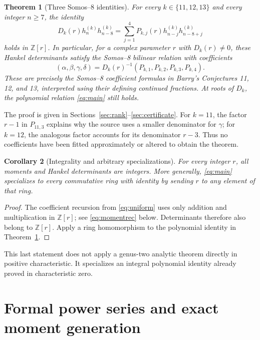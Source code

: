 \documentclass[11pt,letterpaper]{article}
\numberwithin{equation}{section}
\newtheorem{theorem}{Theorem}[section]
\newtheorem{corollary}[theorem]{Corollary}
\theoremstyle{definition}
\newcommand{\Z}{\mathbb Z}
\begin{document}
\begin{theorem}[Three Somos--8 identities]
\label{thm:main}
For every \(k\in\{11,12,13\}\) and every integer \(n\geq7\), the identity
\begin{equation}
 \boxed{\quad
 D_k(r)h_n^{(k)}h_{n-8}^{(k)}
 =\sum_{j=1}^4P_{k,j}(r)h_{n-j}^{(k)}h_{n-8+j}^{(k)}
 \quad}
 \label{eq:main}
\end{equation}
holds in \(\Z[r]\). In particular, for a complex parameter \(r\) with
\(D_k(r)\ne0\), these Hankel determinants satisfy the Somos--8 bilinear
relation with coefficients
\begin{equation}
 (\alpha,\beta,\gamma,\delta)
 =D_k(r)^{-1}(P_{k,1},P_{k,2},P_{k,3},P_{k,4}).
 \label{eq:normalized}
\end{equation}
These are precisely the Somos--8 coefficient formulas in Barry's
Conjectures 11, 12, and 13, interpreted using their defining continued
fractions. At roots of \(D_k\), the polynomial relation \eqref{eq:main}
still holds.
\end{theorem}

The proof is given in Sections~\ref{sec:rank}--\ref{sec:certificate}.
For \(k=11\), the factor \(r-1\) in \(P_{11,3}\) explains why the source
uses a smaller denominator for \(\gamma\); for \(k=12\), the analogous
factor accounts for its denominator \(r-3\). Thus no coefficients have
been fitted approximately or altered to obtain the theorem.

\begin{corollary}[Integrality and arbitrary specializations]
\label{cor:integral}
For every integer \(r\), all moments and Hankel determinants are integers.
More generally, \eqref{eq:main} specializes to every commutative ring with
identity by sending \(r\) to any element of that ring.
\end{corollary}
\begin{proof}
The coefficient recursion from \eqref{eq:uniform} uses only addition and
multiplication in \(\Z[r]\); see \eqref{eq:momentrec} below. Determinants
therefore also belong to \(\Z[r]\). Apply a ring homomorphism to the
polynomial identity in Theorem~\ref{thm:main}.
\end{proof}
This last statement does not apply a genus-two analytic theorem directly in
positive characteristic. It specializes an integral polynomial identity
already proved in characteristic zero.

\section{Formal power series and exact moment generation}
\label{sec:moments}
\end{document}
